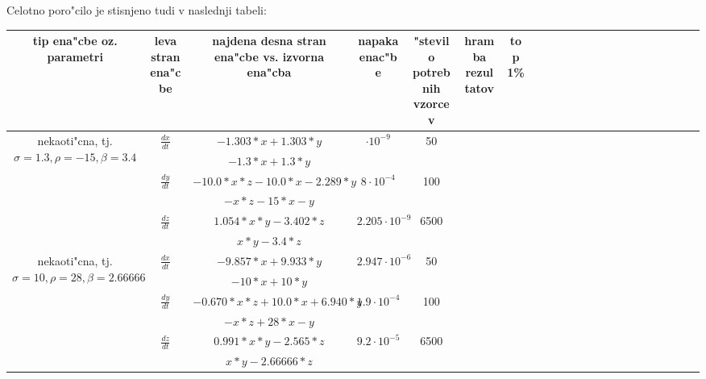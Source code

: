 \documentclass[10pt,a4paper]{article}
\begin{document}
Celotno poro"cilo je stisnjeno tudi v naslednji tabeli:
\begin{table}[h]
	\begin{tabular}{cc *{15}{c}ccccc}
		\multicolumn{1}{p{1cm}|}{tip ena"cbe oz. parametri} & 
		\multicolumn{1}{p{1cm}|}{leva stran ena"cbe} &
		 \multicolumn{1}{p{5cm}|}{najdena desna stran ena"cbe vs. izvorna ena"cba} &
		  \multicolumn{1}{p{2cm}|}{napaka enac"be} &
		   \multicolumn{1}{p{1cm}|}{"stevilo potrebnih vzorcev} & 
		   \multicolumn{1}{p{1cm}|}{hramba rezultatov} & \multicolumn{1}{p{1cm}|}{top 1\%} \\
		   \hline
		\multirow{6}{1.5cm}{nekaoti"cna, tj. $\sigma=1.3, \rho=-15, \beta=3.4$} & \multirow{2}{1.5cm}{$\frac{dx}{dt}$} & $ -1.303*x + 1.303*y $ & $\cdot 10^{-9}$ & 50 & &  \\
								 & & $ -1.3*x + 1.3*y $ & & & \\
								\cline{3-6}
		 & \multirow{2}{1.5cm}{$\frac{dy}{dt}$} & $-10.0*x*z - 10.0*x - 2.289*y$ & $8\cdot 10^{-4}$ & 100 &  \\
								 & & $ -x*z -15*x -y $ & & & \\
								\cline{3-6}
		& \multirow{2}{1.5cm}{$\frac{dz}{dt}$} & $1.054*x*y - 3.402*z$ & $2.205\cdot 10^{-9}$ & 6500 \\
								 & & $ x*y - 3.4*z $ & & & \\
		\hline
		\multirow{6}{1.5cm}{nekaoti"cna, tj. $\sigma=10, \rho=28, \beta=2.66666$} & \multirow{2}{1.5cm}{$\frac{dx}{dt}$} & $-9.857*x + 9.933*y$ & $2.947\cdot 10^{-6}$  & 50 \\
								 & & $ -10*x + 10*y $ & & & \\
								\cline{3-6}
		& \multirow{2}{1.5cm}{$\frac{dy}{dt}$} & $ -0.670*x*z + 10.0*x + 6.940*y $ & $ 1.9\cdot 10^ {-4}$ & 100 \\
								 & & $ -x*z + 28*x -y $ & & & \\
								\cline{3-6}
		& \multirow{2}{1.5cm}{$\frac{dz}{dt}$} & $0.991*x*y - 2.565*z$ & $9.2\cdot 10^ {-5}$ & 6500 \\
								 & & $ x*y - 2.66666*z $ & & & \\
	\end{tabular}
\end{table}


\end{document}

